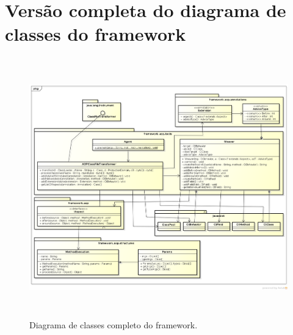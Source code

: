 \documentclass[tc,oneside]{iiufrgs}
\begin{document}
\appendix

\chapter{Versão completa do diagrama de classes do framework}

\begin{figure}[ht]
	\centering
	\includegraphics[width=475px,height=425px,angle=90]{diagramas/Framework_AOP-completo.png}
	\caption{Diagrama de classes completo do framework.}
\end{figure}

\label{apend:A}
\end{document}
